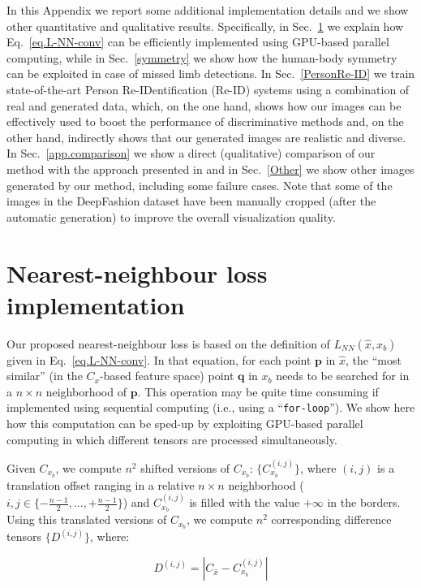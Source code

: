 \documentclass[10pt,twocolumn,letterpaper]{article}
\begin{document}
In this Appendix we report some additional implementation details and we show other quantitative and qualitative results.
Specifically, in Sec.~\ref{GPU} we explain how Eq.~\ref{eq.L-NN-conv} can be efficiently implemented using GPU-based parallel computing, while in Sec.~\ref{symmetry} we show how the human-body symmetry can be exploited in case of missed limb detections.
In Sec.~\ref{PersonRe-ID} we train state-of-the-art Person Re-IDentification (Re-ID) systems using a combination of real and generated data, which, on the one hand, shows how our images can be effectively used to boost the performance of discriminative methods and, on the other hand, indirectly shows that our generated images are realistic and diverse.
In Sec.~\ref{app.comparison} we show a direct (qualitative) comparison of our method with the approach presented in \cite{ma2017pose} and 
 in Sec.~\ref{Other} we show other images generated by our method, including some failure cases.
Note that some of the images in the DeepFashion dataset have been manually cropped (after the automatic generation) to improve the overall visualization quality.

\section{Nearest-neighbour loss implementation}
\label{GPU}

Our proposed nearest-neighbour loss 
is based on the  definition of $L_{NN} (\hat{x}, x_b)$ given in Eq.~\ref{eq.L-NN-conv}.
In that equation, for each point $\mathbf{p}$ in $\hat{x}$, the ``most similar'' (in the $C_x$-based feature space) point $\mathbf{q}$ in $x_b$ needs to be searched for in a $n \times n$ neighborhood of $\mathbf{p}$.
This operation may be quite time consuming if implemented using sequential computing (i.e., using a ``\texttt{for-loop}'').
We show here how this computation can be 
sped-up by exploiting GPU-based parallel computing in which different tensors are processed simultaneously. 

Given  $C_{x_b}$, we  compute $n^2$ 
shifted versions of $C_{x_b}$: $\{C_{x_b}^{(i, j)}\}$, where $(i,j)$ is a translation offset ranging in a relative $n \times n$ neighborhood
($i,j \in \{ - \frac{n-1}{2}, ..., + \frac{n-1}{2} \}$)  
and $C_{x_b}^{(i, j)}$
is filled with the value $+\infty$ in the borders. Using this translated versions of  $C_{x_b}$,
we compute $n^2$ corresponding difference tensors $\{D^{(i, j)}\}$, where:


\begin{equation}
D^{(i, j)} = |C_{\hat{x}} - C_{x_b}^{(i, j)}| 
\end{equation}
\end{document}
